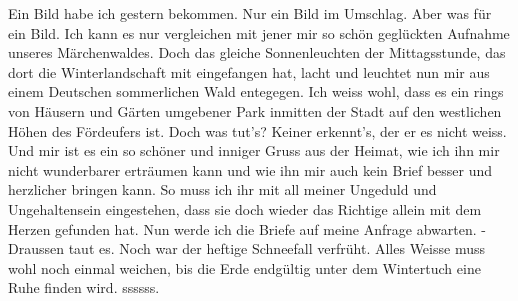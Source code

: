 \def\day{15. November 1942 *}
\mktitle

Ein Bild habe ich gestern bekommen.
Nur ein Bild im Umschlag.
Aber was f\"{u}r ein Bild.
Ich kann es nur vergleichen mit jener mir so sch\"{o}n gegl\"{u}ckten Aufnahme unseres M\"{a}rchenwaldes.
Doch das gleiche Sonnenleuchten der Mittagsstunde, das dort die Winterlandschaft mit eingefangen hat, lacht und leuchtet nun mir aus einem Deutschen sommerlichen Wald entegegen.
Ich weiss wohl, dass es ein rings von H\"{a}usern und G\"{a}rten umgebener Park inmitten der Stadt auf den westlichen H\"{o}hen des F\"{o}rdeufers ist.
Doch was tut's?
Keiner erkennt's, der er es nicht weiss.
Und mir ist es ein so sch\"{o}ner und inniger Gruss aus der Heimat, wie ich ihn mir nicht wunderbarer ertr\"{a}umen kann und wie ihn mir auch kein Brief besser und herzlicher bringen kann.
So muss ich ihr mit all meiner Ungeduld und Ungehaltensein eingestehen, dass sie doch wieder das Richtige allein mit dem Herzen gefunden hat.
Nun werde ich die Briefe auf meine Anfrage abwarten.
- Draussen taut es.
Noch war der heftige Schneefall verfr\"{u}ht.
Alles Weisse muss wohl noch einmal weichen, bis die Erde endg\"{u}ltig unter dem Wintertuch eine Ruhe finden wird. ssssss.

\clearpage
